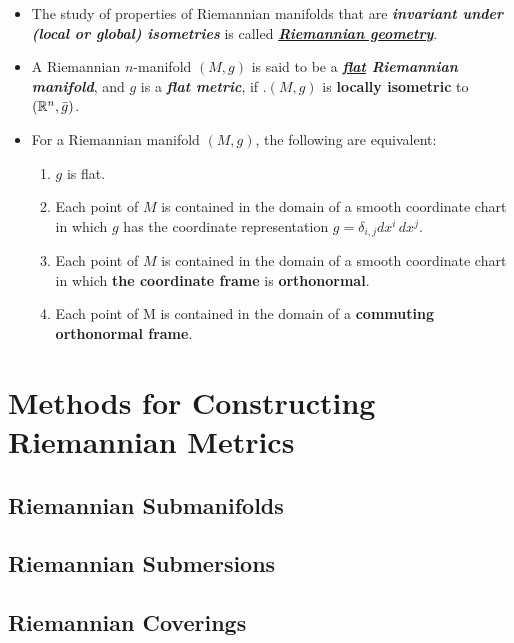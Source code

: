 \documentclass[11pt]{article}
\begin{document}
\begin{itemize}
\item \begin{definition}
The study of properties of Riemannian manifolds that are \emph{\textbf{invariant under (local or global) isometries}} is called \underline{\emph{\textbf{Riemannian geometry}}}.
\end{definition}

\item \begin{definition}
A Riemannian $n$-manifold $(M, g)$ is said to be a \emph{\textbf{\underline{flat} Riemannian manifold}}, and $g$ is a \emph{\textbf{flat metric}}, if .$(M, g)$ is \textbf{locally isometric} to $({\mathbb R}^n, \bar{g})$.
\end{definition}

\item \begin{theorem}
For a Riemannian manifold $(M, g)$, the following are equivalent:
\begin{enumerate}
\item $g$ is flat.
\item Each point of $M$ is contained in the domain of a smooth coordinate chart in which $g$ has the coordinate representation $g = \delta_{i,j}dx^i\,dx^j$.
\item Each point of $M$ is contained in the domain of a smooth coordinate chart in which \textbf{the coordinate frame} is \textbf{orthonormal}.
\item Each point of M is contained in the domain of a \textbf{commuting orthonormal frame}.
\end{enumerate}
\end{theorem}
\end{itemize}
\section{Methods for Constructing Riemannian Metrics}
\subsection{Riemannian Submanifolds}
\subsection{Riemannian Submersions}
\subsection{Riemannian Coverings}
\end{document}
